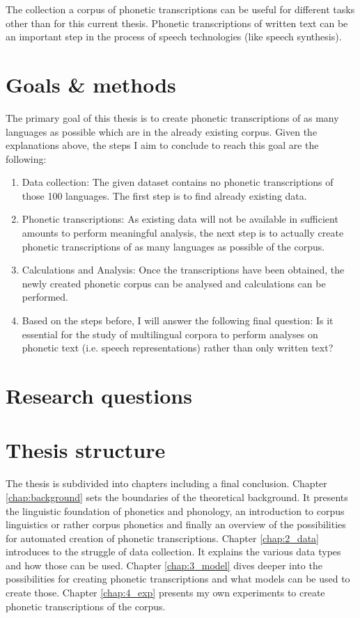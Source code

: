 The collection a corpus of phonetic transcriptions can be useful for different tasks other than for this current thesis. Phonetic transcriptions of written text can be an important step in the process of speech technologies (like speech synthesis). 


\section{Goals \& methods}
The primary goal of this thesis is to create phonetic transcriptions of as many languages as possible which are in the already existing corpus. Given the explanations above, the steps I aim to conclude to reach this goal are the following:
\begin{enumerate}
 \item Data collection: The given dataset contains no phonetic transcriptions of those 100 languages. The first step is to find already existing data. 
 \item Phonetic transcriptions: As existing data will not be available in sufficient amounts to perform meaningful analysis, the next step is to actually create phonetic transcriptions of as many languages as possible of the corpus. 
 \item Calculations and Analysis: Once the transcriptions have been obtained, the newly created phonetic corpus can be analysed and calculations can be performed.
 \item Based on the steps before, I will answer the following final question: Is it essential for the study of multilingual corpora to perform analyses on phonetic text (i.e. speech representations) rather than only written text? 
\end{enumerate}

\section{Research questions}
\label{outline}


\section{Thesis structure}

The thesis is subdivided into  chapters including a final conclusion. Chapter \ref{chap:background} sets the boundaries of the theoretical background. It presents the linguistic foundation of phonetics and phonology, an introduction to corpus linguistics or rather corpus phonetics and finally an overview of the possibilities for automated creation of phonetic transcriptions. Chapter \ref{chap:2_data} introduces to the struggle of data collection. It explains the various data types and how those can be used. Chapter \ref{chap:3_model} dives deeper into the possibilities for creating phonetic transcriptions and what models can be used to create those. Chapter \ref{chap:4_exp} presents my own experiments to create phonetic transcriptions of the corpus.


